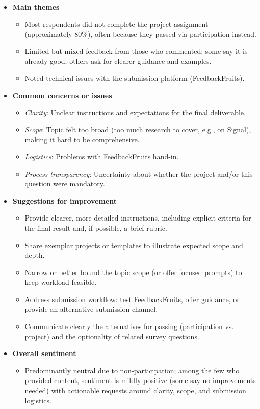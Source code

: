 \documentclass[a4paper]{report}
\begin{document}
\begin{itemize}
\item \textbf{Main themes}
  \begin{itemize}
  \item Most respondents did not complete the project assignment (approximately 80\%), often because they passed via participation instead.
  \item Limited but mixed feedback from those who commented: some say it is already good; others ask for clearer guidance and examples.
  \item Noted technical issues with the submission platform (FeedbackFruits).
  \end{itemize}

\item \textbf{Common concerns or issues}
  \begin{itemize}
  \item \textit{Clarity}: Unclear instructions and expectations for the final deliverable.
  \item \textit{Scope}: Topic felt too broad (too much research to cover, e.g., on Signal), making it hard to be comprehensive.
  \item \textit{Logistics}: Problems with FeedbackFruits hand-in.
  \item \textit{Process transparency}: Uncertainty about whether the project and/or this question were mandatory.
  \end{itemize}

\item \textbf{Suggestions for improvement}
  \begin{itemize}
  \item Provide clearer, more detailed instructions, including explicit criteria for the final result and, if possible, a brief rubric.
  \item Share exemplar projects or templates to illustrate expected scope and depth.
  \item Narrow or better bound the topic scope (or offer focused prompts) to keep workload feasible.
  \item Address submission workflow: test FeedbackFruits, offer guidance, or provide an alternative submission channel.
  \item Communicate clearly the alternatives for passing (participation vs. project) and the optionality of related survey questions.
  \end{itemize}

\item \textbf{Overall sentiment}
  \begin{itemize}
  \item Predominantly neutral due to non-participation; among the few who provided content, sentiment is mildly positive (some say no improvements needed) with actionable requests around clarity, scope, and submission logistics.
  \end{itemize}
\end{itemize}
\end{document}
